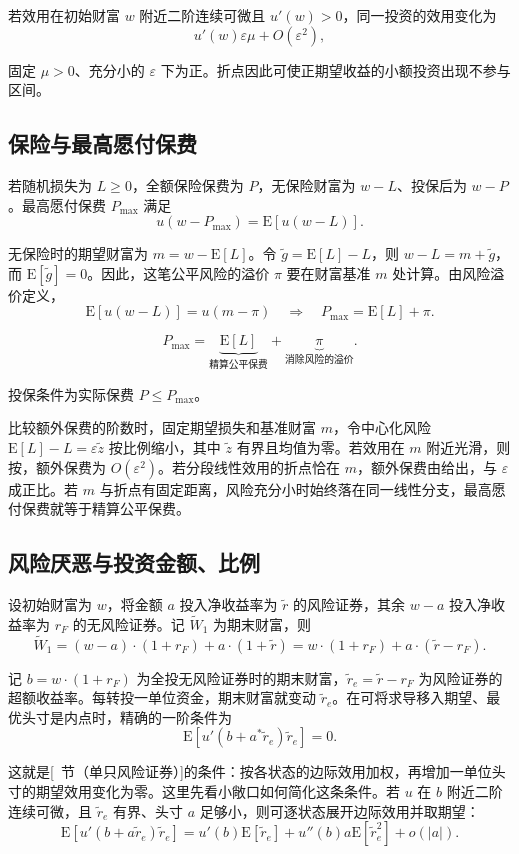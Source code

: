 若效用在初始财富 $w$ 附近二阶连续可微且 $u'(w)>0$，同一投资的效用变化为
\[
 u'(w)\varepsilon\mu+O(\varepsilon^2),
\]

固定 $\mu>0$、充分小的 $\varepsilon$ 下为正。折点因此可使正期望收益的小额投资出现不参与区间。

\subsection{保险与最高愿付保费}
若随机损失为 $L\ge0$，全额保险保费为 $P$，无保险财富为 $w-L$、投保后为 $w-P$。最高愿付保费 $P_{\max}$ 满足
\[
 u(w-P_{\max})=\mathrm E[u(w-L)].
\]

无保险时的期望财富为 $m=w-\mathrm E[L]$。令 $\tilde g=\mathrm E[L]-L$，则 $w-L=m+\tilde g$，而 $\mathrm E[\tilde g]=0$。因此，这笔公平风险的溢价 $\pi$ 要在财富基准 $m$ 处计算。由风险溢价定义，
\[
 \mathrm E[u(w-L)]=u(m-\pi)
 \quad\Longrightarrow\quad P_{\max}=\mathrm E[L]+\pi.
\]
\begin{tcolorbox}[knowledge,title=最高愿付保费]
\[
 P_{\max}=\underbrace{\mathrm E[L]}_{\text{精算公平保费}}+\underbrace{\pi}_{\text{消除风险的溢价}}.
\]

投保条件为实际保费 $P\le P_{\max}$。
\end{tcolorbox}
比较额外保费的阶数时，固定期望损失和基准财富 $m$，令中心化风险 $\mathrm E[L]-L=\varepsilon\tilde z$ 按比例缩小，其中 $\tilde z$ 有界且均值为零。若效用在 $m$ 附近光滑，则按，额外保费为 $O(\varepsilon^2)$。若分段线性效用的折点恰在 $m$，额外保费由给出，与 $\varepsilon$ 成正比。若 $m$ 与折点有固定距离，风险充分小时始终落在同一线性分支，最高愿付保费就等于精算公平保费。

\subsection{风险厌恶与投资金额、比例}
设初始财富为 $w$，将金额 $a$ 投入净收益率为 $\tilde r$ 的风险证券，其余 $w-a$ 投入净收益率为 $r_F$ 的无风险证券。记 $\widetilde W_1$ 为期末财富，则
\[
 \widetilde W_1=(w-a)\cdot(1+r_F)+a\cdot(1+\tilde r)
 =w\cdot(1+r_F)+a\cdot(\tilde r-r_F).
\]

记 $b=w\cdot(1+r_F)$ 为全投无风险证券时的期末财富，$\tilde r_e=\tilde r-r_F$ 为风险证券的超额收益率。每转投一单位资金，期末财富就变动 $\tilde r_e$。在可将求导移入期望、最优头寸是内点时，精确的一阶条件为
\[
 \mathrm E[u'(b+a^*\tilde r_e)\tilde r_e]=0.
\]

这就是[~节（单只风险证券）]的条件：按各状态的边际效用加权，再增加一单位头寸的期望效用变化为零。这里先看小敞口如何简化这条条件。若 $u$ 在 $b$ 附近二阶连续可微，且 $\tilde r_e$ 有界、头寸 $a$ 足够小，则可逐状态展开边际效用并取期望：
\[
 \mathrm E[u'(b+a\tilde r_e)\tilde r_e]
 =u'(b)\mathrm E[\tilde r_e]+u''(b)a\mathrm E[\tilde r_e^2]+o(|a|).
\]

